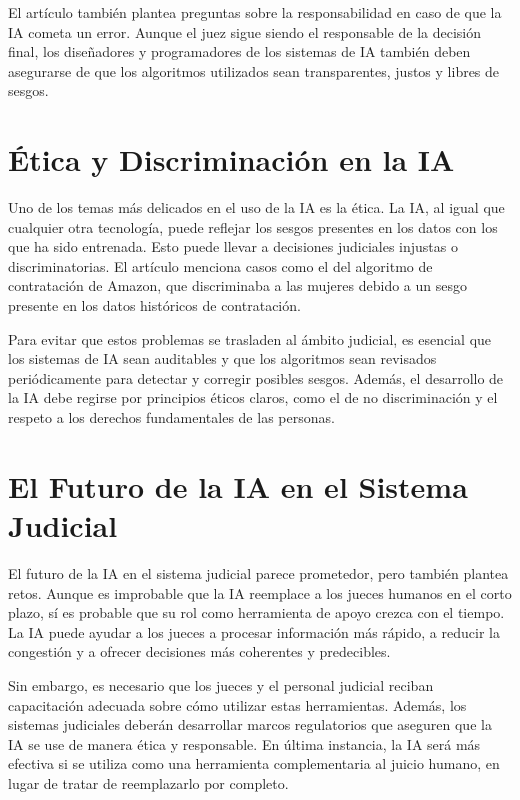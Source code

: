 \documentclass[runningheads]{llncs}
\begin{document}
El artículo también plantea preguntas sobre la responsabilidad en caso de que la IA cometa un error. Aunque el juez sigue siendo el responsable de la decisión final, los diseñadores y programadores de los sistemas de IA también deben asegurarse de que los algoritmos utilizados sean transparentes, justos y libres de sesgos.
\section{Ética y Discriminación en la IA}
Uno de los temas más delicados en el uso de la IA es la ética. La IA, al igual que cualquier otra tecnología, puede reflejar los sesgos presentes en los datos con los que ha sido entrenada. Esto puede llevar a decisiones judiciales injustas o discriminatorias. El artículo menciona casos como el del algoritmo de contratación de Amazon, que discriminaba a las mujeres debido a un sesgo presente en los datos históricos de contratación.

Para evitar que estos problemas se trasladen al ámbito judicial, es esencial que los sistemas de IA sean auditables y que los algoritmos sean revisados periódicamente para detectar y corregir posibles sesgos. Además, el desarrollo de la IA debe regirse por principios éticos claros, como el de no discriminación y el respeto a los derechos fundamentales de las personas.
\section{El Futuro de la IA en el Sistema Judicial}
El futuro de la IA en el sistema judicial parece prometedor, pero también plantea retos. Aunque es improbable que la IA reemplace a los jueces humanos en el corto plazo, sí es probable que su rol como herramienta de apoyo crezca con el tiempo. La IA puede ayudar a los jueces a procesar información más rápido, a reducir la congestión y a ofrecer decisiones más coherentes y predecibles.

Sin embargo, es necesario que los jueces y el personal judicial reciban capacitación adecuada sobre cómo utilizar estas herramientas. Además, los sistemas judiciales deberán desarrollar marcos regulatorios que aseguren que la IA se use de manera ética y responsable. En última instancia, la IA será más efectiva si se utiliza como una herramienta complementaria al juicio humano, en lugar de tratar de reemplazarlo por completo.
\end{document}
